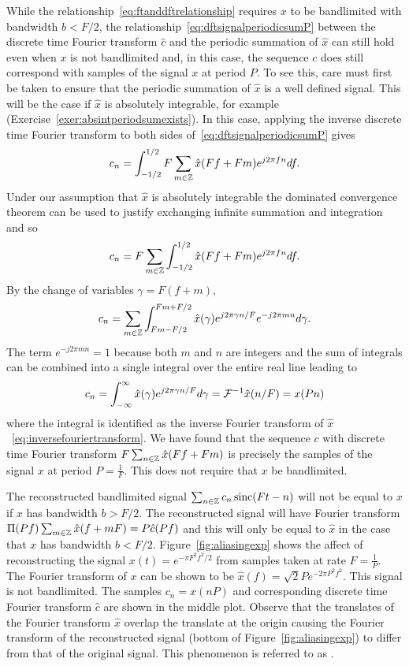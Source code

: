 While the relationship~\eqref{eq:ftanddftrelationship} requires $x$ to be bandlimited with bandwidth $b < F/2$,  the relationship~\eqref{eq:dftsignalperiodicsumP} between the discrete time Fourier transform $\hat{c}$ and the periodic summation of $\hat{x}$ can still hold even when $x$ is not bandlimited and, in this case, the sequence $c$ does still correspond with samples of the signal $x$ at period $P$.  To see this, care must first be taken to ensure that the periodic summation of $\hat{x}$ is a well defined signal.  This will be the case if $\hat{x}$ is absolutely integrable, for example (Exercise~\ref{exer:absintperiodsumexists}).  In this case, applying the inverse discrete time Fourier transform to both sides of~\eqref{eq:dftsignalperiodicsumP} gives
\[
c_n = \int_{-1/2}^{1/2} F \sum_{m \in {\mathbb Z}} \hat{x}(Ff + Fm)  e^{j 2\pi f n } df.
\]
Under our assumption that $\hat{x}$ is absolutely integrable the dominated convergence theorem can be used to justify exchanging infinite summation and integration~\cite[Section~4.2]{Pinsky_Wavelets_2002} and so
\[
c_n =  F \sum_{m \in {\mathbb Z}} \int_{-1/2}^{1/2} \hat{x}(Ff + Fm)  e^{j 2\pi f n } df.
\]
By the change of variables $\gamma = F(f + m)$,
\[
c_n = \sum_{m\in {\mathbb Z}} \int_{Fm-F/2}^{Fm+F/2} \hat{x}(\gamma)  e^{j 2\pi \gamma n/F}  e^{-j 2\pi m n} d\gamma.
\]
The term $e^{-j 2\pi m n} = 1$ because both $m$ and $n$ are integers and the sum of integrals can be combined into a single integral over the entire real line leading to
\[
c_n = \int_{-\infty}^{\infty} \hat{x}(\gamma)  e^{j 2\pi \gamma n/F} d\gamma = {\mathcal F}^{-1} \hat{x}(n/F) = x(Pn)
\]
where the integral is identified as the inverse Fourier transform of $\hat{x}$~\eqref{eq:inversefouriertransform}.  We have found that the sequence $c$ with discrete time Fourier transform $F \sum_{n\in{\mathbb Z}} \hat{x}(Ff + Fm)$ is precisely the samples of the signal $x$ at period $P = \tfrac{1}{F}$.  This does not require that $x$ be bandlimited.  

The reconstructed bandlimited signal $\sum_{n \in {\mathbb Z}} c_n \operatorname{sinc}(Ft - n)$ will not be equal to $x$ if $x$ has bandwidth $b > F/2$.  The reconstructed signal will have Fourier transform $\Pi(Pf) \sum_{m \in {\mathbb Z}} \hat{x}(f + mF) = P \hat{c}(Pf)$ and this will only be equal to $\hat{x}$ in the case that $x$ has bandwidth $b < F/2$.  Figure~\ref{fig:aliasingexp} shows the affect of reconstructing the signal $x(t) = e^{-\pi F^2 f^2/2}$ from samples taken at rate $F = \tfrac{1}{P}$.  The Fourier transform of $x$ can be shown to be $\hat{x}(f) = \sqrt{2} P e^{-2 \pi P^2 f^2}$.  This signal is not bandlimited.  The samples $c_n = x(nP)$ and corresponding discrete time Fourier transform $\hat{c}$ are shown in the middle plot.  Observe that the translates of the Fourier transform $\hat{x}$ overlap the translate at the origin causing the Fourier transform of the reconstructed signal (bottom of Figure~\ref{fig:aliasingexp}) to differ from that of the original signal.  This phenomenon is referred to as .


